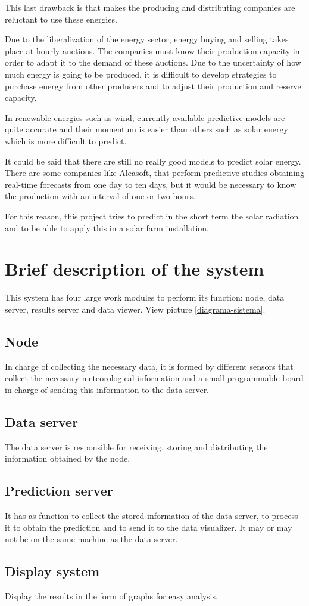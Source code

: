 This last drawback is that makes the producing and distributing companies are reluctant to use these energies.

Due to the liberalization of the energy sector, energy buying and selling takes place at hourly auctions. The companies must know their production capacity in order to adapt it to the demand of these auctions. Due to the uncertainty of how much energy is going to be produced, it is difficult to develop strategies to purchase energy from other producers and to adjust their production and reserve capacity.

In renewable energies such as wind, currently available predictive models are quite accurate and their momentum is easier than others such as solar energy which is more difficult to predict.

It could be said that there are still no really good models to predict solar energy. There are some companies like \href{https://aleasoft.com/es/}{Aleasoft}, that perform predictive studies obtaining real-time forecasts from one day to ten days, but it would be necessary to know the production with an interval of one or two hours.

For this reason, this project tries to predict in the short term the solar radiation and to be able to apply this in a solar farm installation.

\section{Brief description of the system}
\label{makereference2.2}
This system has four large work modules to perform its function: node, data server, results server and data viewer. View picture \ref{diagrama-sistema}.

\subsection{Node}
\label{makereference2.2.1}
In charge of collecting the necessary data, it is formed by different sensors that collect the necessary meteorological information and a small programmable board in charge of sending this information to the data server.

\subsection{Data server}
\label{makereference2.2.2}
The data server is responsible for receiving, storing and distributing the information obtained by the node.

\subsection{Prediction server}
\label{makereference2.2.3}
It has as function to collect the stored information of the data server, to process it to obtain the prediction and to send it to the data visualizer. It may or may not be on the same machine as the data server.

\subsection{Display system}
\label{makereference2.2.4}
Display the results in the form of graphs for easy analysis.